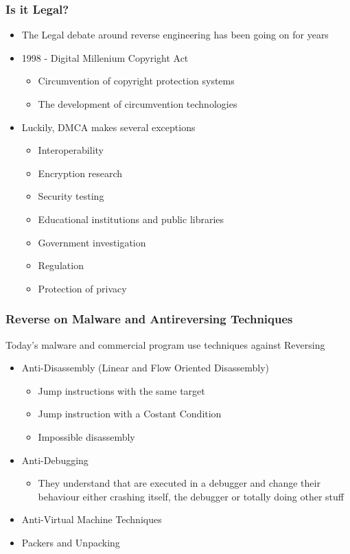 \documentclass[]{beamer}
\begin{document}
		\begin{frame}
			\frametitle{Is it Legal?}
			\begin{itemize}
				\item{The Legal debate around reverse engineering has been going on for years}
				\item{1998 -  Digital Millenium Copyright Act}
					\begin{itemize}
						\item{Circumvention of copyright protection systems}
						\item{The development of circumvention technologies}
					\end{itemize}
				\item{Luckily, DMCA makes several exceptions}
					\begin{itemize}
						\item{Interoperability}
						\item{Encryption research}
						\item{Security testing}
						\item{Educational institutions and public libraries}
						\item{Government investigation}
						\item{Regulation}
						\item{Protection of privacy}
					\end{itemize}
			\end{itemize}
		\end{frame}
		\begin{frame}
			\frametitle{Reverse on Malware and Antireversing Techniques}
			Today's malware and commercial program use techniques against Reversing
			\begin{itemize}
				\item{Anti-Disassembly (Linear and Flow Oriented Disassembly)}
					\begin{itemize}
						\item{Jump instructions with the same target}
						\item{Jump instruction with a Costant Condition}
						\item{Impossible disassembly}
					\end{itemize}
				\item{Anti-Debugging}
					\begin{itemize}
						\item{They understand that are executed in a debugger and change their behaviour either crashing itself, the debugger or totally doing other stuff}
					\end{itemize}
				\item{Anti-Virtual Machine Techniques}
				\item{Packers and Unpacking}
			\end{itemize}
		\end{frame}
\end{document}
